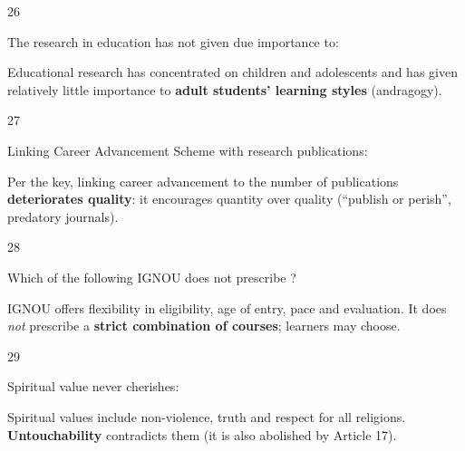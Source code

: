 \begin{question}{26}
{The research in education has not given due importance to:\par}
\begin{explain}
Educational research has concentrated on children and adolescents and has given relatively little importance to \textbf{adult students' learning styles} (andragogy).
\end{explain}
\end{question}

\begin{question}{27}
{Linking Career Advancement Scheme with research publications:\par}
\begin{explain}
Per the key, linking career advancement to the number of publications \textbf{deteriorates quality}: it encourages quantity over quality (``publish or perish'', predatory journals).
\end{explain}
\end{question}

\begin{question}{28}
{Which of the following IGNOU does not prescribe ?\par}
\begin{explain}
IGNOU offers flexibility in eligibility, age of entry, pace and evaluation. It does \emph{not} prescribe a \textbf{strict combination of courses}; learners may choose.
\end{explain}
\end{question}

\begin{question}{29}
{Spiritual value never cherishes:\par}
\begin{explain}
Spiritual values include non-violence, truth and respect for all religions. \textbf{Untouchability} contradicts them (it is also abolished by Article 17).
\end{explain}
\end{question}

